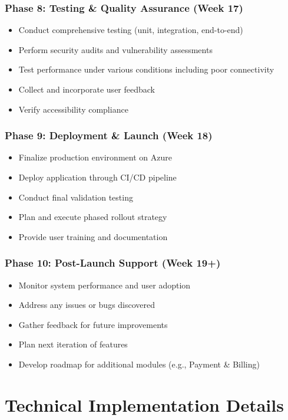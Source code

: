 \documentclass[11pt]{report}
\begin{document}
\subsection{Phase 8: Testing \& Quality Assurance (Week 17)}
\begin{itemize}
    \item Conduct comprehensive testing (unit, integration, end-to-end)
    \item Perform security audits and vulnerability assessments
    \item Test performance under various conditions including poor connectivity
    \item Collect and incorporate user feedback
    \item Verify accessibility compliance
\end{itemize}

\subsection{Phase 9: Deployment \& Launch (Week 18)}
\begin{itemize}
    \item Finalize production environment on Azure
    \item Deploy application through CI/CD pipeline
    \item Conduct final validation testing
    \item Plan and execute phased rollout strategy
    \item Provide user training and documentation
\end{itemize}

\subsection{Phase 10: Post-Launch Support (Week 19+)}
\begin{itemize}
    \item Monitor system performance and user adoption
    \item Address any issues or bugs discovered
    \item Gather feedback for future improvements
    \item Plan next iteration of features
    \item Develop roadmap for additional modules (e.g., Payment & Billing)
\end{itemize}

\chapter{Technical Implementation Details}
\end{document}
